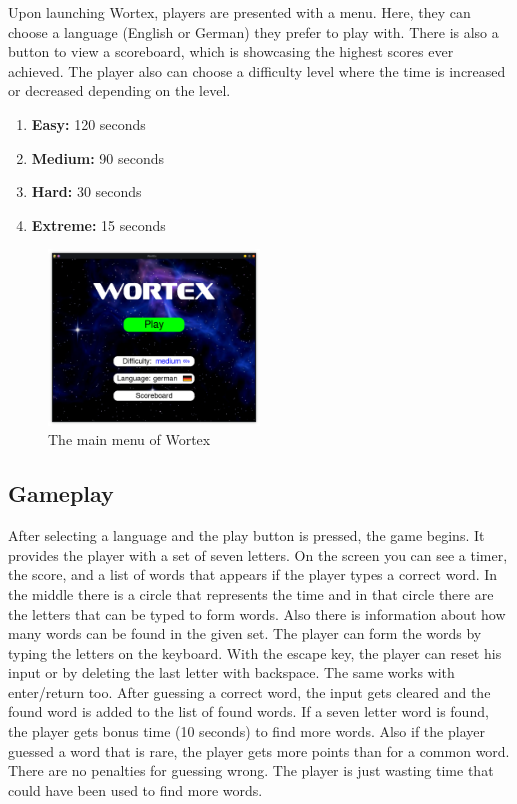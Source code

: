 \documentclass{article}[12pt]
\begin{document}
    Upon launching Wortex, players are presented with a menu. Here, they can
    choose a language (English or German) they prefer to play with. There is also
    a button to view a scoreboard, which is showcasing the highest scores ever
    achieved. The player also can choose a difficulty level where the time is 
    increased or decreased depending on the level.

    \begin{enumerate}
        \item \textbf{Easy:} 120 seconds
        \item \textbf{Medium:} 90 seconds
        \item \textbf{Hard:} 30 seconds
        \item \textbf{Extreme:} 15 seconds
    \end{enumerate}

    \begin{figure}[ht]
        \centering
        \includegraphics[width=0.5\textwidth]{pictures/menu.png}
        \caption{The main menu of Wortex}
    \end{figure}


    \subsection*{Gameplay}

    After selecting a language and the play button is pressed, the game begins.
    It provides the player with a set of seven letters. On the screen you can
    see a timer, the score, and a list of words that appears if the player
    types a correct word. In the middle there is a circle that represents the
    time and in that circle there are the letters that can be typed to form
    words. Also there is information about how many words can be found in the
    given set. The player can form the words by typing the letters on the
    keyboard. With the escape key, the player can reset his input or by
    deleting the last letter with backspace. The same works with enter\slash return too.
    After guessing a correct word, the input gets cleared and the found word is
    added to the list of found words. If a seven letter word is found, the
    player gets bonus time (10 seconds) to find more words. Also if the player
    guessed a word that is rare, the player gets more points than for a common
    word. There are no penalties for guessing wrong. The player is just wasting
    time that could have been used to find more words. 
\end{document}
